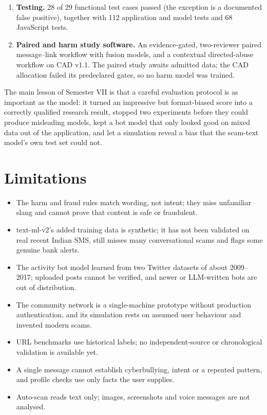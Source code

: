 \begin{enumerate}
\item \textbf{Testing.} 28 of 29 functional test cases passed (the exception is a documented false positive), together with 112 application and model tests and 68 JavaScript tests.
\item \textbf{Paired and harm study software.} An evidence-gated, two-reviewer paired message--link workflow with fusion models, and a contextual directed-abuse workflow on CAD v1.1. The paired study awaits admitted data; the CAD allocation failed its predeclared gates, so no harm model was trained.
\end{enumerate}

\noindent The main lesson of Semester VII is that a careful evaluation protocol is as important as the model: it turned an impressive but format-biased score into a correctly qualified research result, stopped two experiments before they could produce misleading models, kept a bot model that only looked good on mixed data out of the application, and let a simulation reveal a bias that the scam-text model's own test set could not.

\section{Limitations}
\begin{itemize}
\item The harm and fraud rules match wording, not intent; they miss unfamiliar slang and cannot prove that content is safe or fraudulent.
\item text-ml-v2's added training data is synthetic; it has not been validated on real recent Indian SMS, still misses many conversational scams and flags some genuine bank alerts.
\item The activity bot model learned from two Twitter datasets of about 2009--2017; uploaded posts cannot be verified, and newer or LLM-written bots are out of distribution.
\item The community network is a single-machine prototype without production authentication, and its simulation rests on assumed user behaviour and invented modern scams.
\item URL benchmarks use historical labels; no independent-source or chronological validation is available yet.
\item A single message cannot establish cyberbullying, intent or a repeated pattern, and profile checks use only facts the user supplies.
\item Auto-scan reads text only; images, screenshots and voice messages are not analysed.
\end{itemize}

